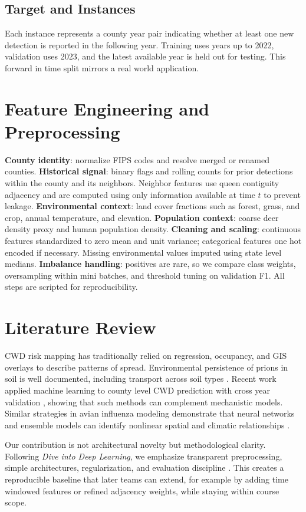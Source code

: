 \documentclass[conference]{IEEEtran}
\begin{document}
\subsection*{Target and Instances}
Each instance represents a county year pair indicating whether at least one new detection is reported in the following year. Training uses years up to 2022, validation uses 2023, and the latest available year is held out for testing. This forward in time split mirrors a real world application.

\section{Feature Engineering and Preprocessing}
\textbf{County identity}: normalize FIPS codes and resolve merged or renamed counties.  
\textbf{Historical signal}: binary flags and rolling counts for prior detections within the county and its neighbors. Neighbor features use queen contiguity adjacency and are computed using only information available at time $t$ to prevent leakage.  
\textbf{Environmental context}: land cover fractions such as forest, grass, and crop, annual temperature, and elevation.  
\textbf{Population context}: coarse deer density proxy and human population density.  
\textbf{Cleaning and scaling}: continuous features standardized to zero mean and unit variance; categorical features one hot encoded if necessary. Missing environmental values imputed using state level medians.  
\textbf{Imbalance handling}: positives are rare, so we compare class weights, oversampling within mini batches, and threshold tuning on validation F1. All steps are scripted for reproducibility.

\section{Literature Review}
CWD risk mapping has traditionally relied on regression, occupancy, and GIS overlays to describe patterns of spread. Environmental persistence of prions in soil is well documented, including transport across soil types \cite{kuznetsova2023soil,kuznetsova2024soils}. Recent work applied machine learning to county level CWD prediction with cross year validation \cite{ahmed2024county}, showing that such methods can complement mechanistic models. Similar strategies in avian influenza modeling demonstrate that neural networks and ensemble models can identify nonlinear spatial and climatic relationships \cite{kieran2024hpaiv}. 

Our contribution is not architectural novelty but methodological clarity. Following \textit{Dive into Deep Learning}, we emphasize transparent preprocessing, simple architectures, regularization, and evaluation discipline \cite{d2l}. This creates a reproducible baseline that later teams can extend, for example by adding time windowed features or refined adjacency weights, while staying within course scope.
\end{document}
